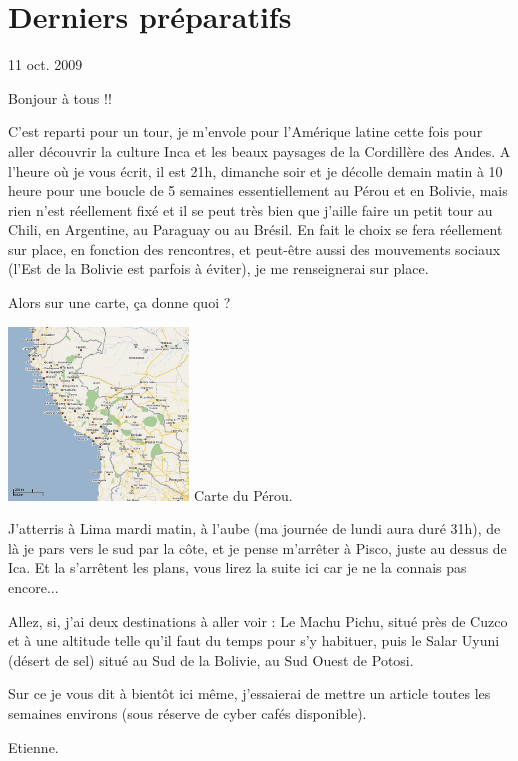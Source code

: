 \section{Derniers préparatifs}

11 oct. 2009

\begin{multicols}{2}

Bonjour à tous !!

C'est reparti pour un tour, je m'envole pour l'Amérique latine cette fois pour aller découvrir la culture Inca et les beaux paysages de la Cordillère des Andes. A l'heure où je vous écrit, il est 21h, dimanche soir et je décolle demain matin à 10 heure pour une boucle de 5 semaines essentiellement au Pérou et en Bolivie, mais rien n'est réellement fixé et il se peut très bien que j'aille faire un petit tour au Chili, en Argentine, au Paraguay ou au Brésil. En fait le choix se fera réellement sur place, en fonction des rencontres, et peut-être aussi des mouvements sociaux (l'Est de la Bolivie est parfois à éviter), je me renseignerai sur place.

Alors sur une carte, ça donne quoi ?

\hspace*{-0.65cm}
\includegraphics[width=4.8cm]{articles/Derniers-preparatifs/1255286224vDMd.jpg}
Carte du Pérou.

J'atterris à Lima mardi matin, à l'aube (ma journée de lundi aura duré 31h), de là je pars vers le sud par la côte, et je pense m'arrêter à Pisco, juste au dessus de Ica. Et la s'arrêtent les plans, vous lirez la suite ici car je ne la connais pas encore...

Allez, si, j'ai deux destinations à aller voir : Le Machu Pichu, situé près de Cuzco et à une altitude telle qu'il faut du temps pour s'y habituer, puis le Salar Uyuni (désert de sel) situé au Sud de la Bolivie, au Sud Ouest de Potosi.

Sur ce je vous dit à bientôt ici même, j'essaierai de mettre un article toutes les semaines environs (sous réserve de cyber cafés disponible).

Etienne.

\end{multicols}


